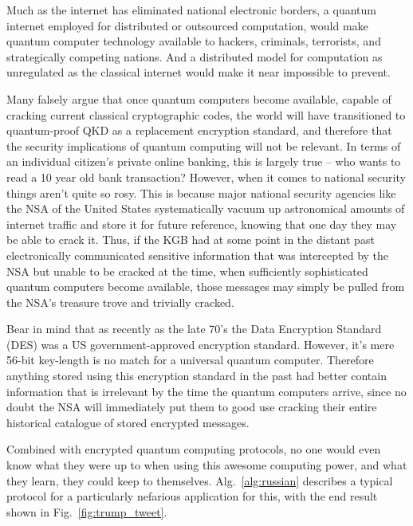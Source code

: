 Much as the internet has eliminated national electronic borders, a quantum internet employed for distributed or outsourced computation, would make quantum computer technology available to hackers, criminals, terrorists, and strategically competing nations. And a distributed model for computation as unregulated as the classical internet would make it near impossible to prevent.

Many falsely argue that once quantum computers become available, capable of cracking current classical cryptographic codes, the world will have transitioned to quantum-proof QKD as a replacement encryption standard, and therefore that the security implications of quantum computing will not be relevant. In terms of an individual citizen's private online banking, this is largely true -- who wants to read a 10 year old bank transaction? However, when it comes to national security things aren't quite so rosy. This is because major national security agencies like the NSA of the United States systematically vacuum up astronomical amounts of internet traffic and store it for future reference, knowing that one day they may be able to crack it. Thus, if the KGB had at some point in the distant past electronically communicated sensitive information that was intercepted by the NSA but unable to be cracked at the time, when sufficiently sophisticated quantum computers become available, those messages may simply be pulled from the NSA's treasure trove and trivially cracked.

Bear in mind that as recently as the late 70's the Data Encryption Standard (DES) was a US government-approved encryption standard. However, it's mere 56-bit key-length is no match for a universal quantum computer. Therefore anything stored using this encryption standard in the past had better contain information that is irrelevant by the time the quantum computers arrive, since no doubt the NSA will immediately put them to good use cracking their entire historical catalogue of stored encrypted messages.

Combined with encrypted quantum computing protocols, no one would even know what they were up to when using this awesome computing power, and what they learn, they could keep to themselves.
\pubmode
\else
Alg.~\ref{alg:russian} describes a typical protocol for a particularly nefarious application for this, with the end result shown in Fig.~\ref{fig:trump_tweet}.


